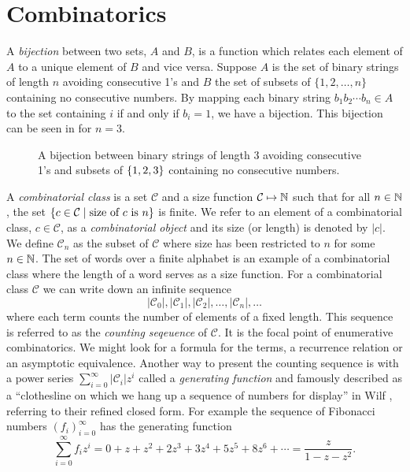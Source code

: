 \label{ch:backgr}
\section{Combinatorics\label{sec:combinatorics}}
A \emph{bijection} between two sets, $A$ and $B$, is a function which relates each element of $A$ to a unique element of $B$ and vice versa. Suppose $A$ is the set of binary strings of length $n$ avoiding consecutive 1's and $B$ the set of subsets of $\{1,2,\ldots,n\}$ containing no consecutive numbers. By mapping each binary string $b_1b_2\dotsm b_n \in A$ to the set containing $i$ if and only if $b_i=1$, we have a bijection. This bijection can be seen in  for $n=3$.

\begin{figure}[ht!]
    \centering
    
    \caption{A bijection between binary strings of length 3 avoiding consecutive 1's and subsets of $\left\{1,2,3\right\}$ containing no consecutive numbers.}
    \label{fig:bijection_example}
\end{figure}

A \emph{combinatorial class} is a set $\mathcal{C}$ and a size function $\mathcal{C} \mapsto \mathbb{N}$ such that for all $n\in\mathbb{N}$, the set $\left\{c \in \mathcal{C} \mid \text{size of $c$ is $n$}\right\}$ is finite. We refer to an element of a combinatorial class, $c\in\mathcal{C}$, as a \emph{combinatorial object} and its size (or length) is denoted by $|c|$. We define $\mathcal{C}_n$ as the subset of $\mathcal{C}$ where size has been restricted to $n$ for some $n\in\mathbb{N}$. The set of words over a finite alphabet is an example of a combinatorial class where the length of a word serves as a size function. For a combinatorial class $\mathcal{C}$ we can write down an infinite sequence 
\[
    |\mathcal{C}_0|, |\mathcal{C}_1|, |\mathcal{C}_2|,\dotsc,|\mathcal{C}_n|,\dotsc
\]
where each term counts the number of elements of a fixed length. This sequence is referred to as the \emph{counting seqeuence} of $\mathcal{C}$. It is the focal point of enumerative combinatorics. We might look for a formula for the terms, a recurrence relation or an asymptotic equivalence. Another way to present the counting sequence is with a power series $\sum_{i=0}^\infty |\mathcal{C}_i|z^i$ called a \emph{generating function} and famously described as a ``clothesline on which we hang up a sequence of numbers for display'' in Wilf \cite{wilf:gf}, referring to their refined closed form. For example the sequence of Fibonacci numbers $\left(f_i\right)_{i=0}^\infty$ has the generating function
\[
    \sum_{i=0}^\infty f_iz^i = 0 + z + z^2 + 2z^3 + 3z^4 + 5z^5 + 8z^6 + \dotsb = \frac{z}{1-z-z^2}.
\]

